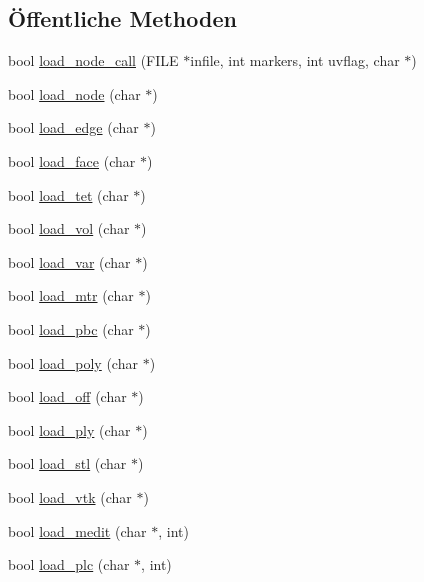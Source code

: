 \subsection*{Öffentliche Methoden}
\begin{DoxyCompactItemize}
\item 
bool \hyperlink{classtetgenio_a72c82390f2cf5cc8e82b7e78d3957d97}{load\-\_\-node\-\_\-call} (F\-I\-L\-E $\ast$infile, int markers, int uvflag, char $\ast$)
\item 
bool \hyperlink{classtetgenio_afeb93fe605c74f7523314fe21b726872}{load\-\_\-node} (char $\ast$)
\item 
bool \hyperlink{classtetgenio_ae57d905901345797047108bc8995382a}{load\-\_\-edge} (char $\ast$)
\item 
bool \hyperlink{classtetgenio_acfd5a05583426d2d50c554e353814b22}{load\-\_\-face} (char $\ast$)
\item 
bool \hyperlink{classtetgenio_afcb7616b65ca87657affbdad0c9dbe0b}{load\-\_\-tet} (char $\ast$)
\item 
bool \hyperlink{classtetgenio_ad2c1a5e053689f1e68c0c849d3ebcd3d}{load\-\_\-vol} (char $\ast$)
\item 
bool \hyperlink{classtetgenio_a42b38e1e09d889f3027225402d888721}{load\-\_\-var} (char $\ast$)
\item 
bool \hyperlink{classtetgenio_a281d6699f746ac5d2b4ca70075be53c7}{load\-\_\-mtr} (char $\ast$)
\item 
bool \hyperlink{classtetgenio_a9c3559e0c61df8bb9d4ccff74af39cc0}{load\-\_\-pbc} (char $\ast$)
\item 
bool \hyperlink{classtetgenio_a88658f64d725eb11ff33e7104e14561b}{load\-\_\-poly} (char $\ast$)
\item 
bool \hyperlink{classtetgenio_a71c8e637cb420c3a87b648405df47abd}{load\-\_\-off} (char $\ast$)
\item 
bool \hyperlink{classtetgenio_a9b2764289916b479bda5f78b7e6189dc}{load\-\_\-ply} (char $\ast$)
\item 
bool \hyperlink{classtetgenio_a90b035937bf1ff57597f7ba8ecf3d21f}{load\-\_\-stl} (char $\ast$)
\item 
bool \hyperlink{classtetgenio_a566bcdee657ea1ca15a64bcb2acd4231}{load\-\_\-vtk} (char $\ast$)
\item 
bool \hyperlink{classtetgenio_a5008aeef714575c2cd9c74da1354b962}{load\-\_\-medit} (char $\ast$, int)
\item 
bool \hyperlink{classtetgenio_ac47582d8d9a09f1d8d32221527a0aa7b}{load\-\_\-plc} (char $\ast$, int)
\item 

\end{DoxyCompactItemize}

